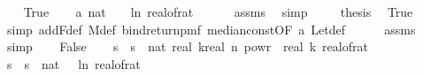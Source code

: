 \begin{isabellebody}
\ \ \isamarkupfalse%
\ True\isanewline
\ \ \isamarkupfalse%
\ a{\isacharcolon}{\kern0pt}\ {\isachardoublequoteopen}nat\ {\isasymlceil}{\isacharminus}{\kern0pt}\ {\isacharparenleft}{\kern0pt}{}{}\ {\isacharasterisk}{\kern0pt}\ ln\ {\isacharparenleft}{\kern0pt}real{\isacharunderscore}{\kern0pt}of{\isacharunderscore}{\kern0pt}rat\ {\isasymepsilon}{\isacharparenright}{\kern0pt}{\isacharparenright}{\kern0pt}{\isasymrceil}\ {\isachargreater}{\kern0pt}\ {}{\isachardoublequoteclose}\ \ \isamarkupfalse%
\ assms\ \isamarkupfalse%
\ simp\ \isanewline
\ \ \isamarkupfalse%
\ {\isacharquery}{\kern0pt}thesis\ \isamarkupfalse%
\ True\ \isamarkupfalse%
\ {\isacharparenleft}{\kern0pt}simp\ add{\isacharcolon}{\kern0pt}F{\isacharunderscore}{\kern0pt}def\ M{\isacharunderscore}{\kern0pt}def\ bind{\isacharunderscore}{\kern0pt}return{\isacharunderscore}{\kern0pt}pmf\ median{\isacharunderscore}{\kern0pt}const{\isacharbrackleft}{\kern0pt}OF\ a{\isacharbrackright}{\kern0pt}\ Let{\isacharunderscore}{\kern0pt}def{\isacharparenright}{\kern0pt}\isanewline
\ \ \ \ \isamarkupfalse%
\ assms{\isacharparenleft}{\kern0pt}{}{\isacharparenright}{\kern0pt}\ \isamarkupfalse%
\ simp\isanewline
{}\isamarkupfalse%
\isanewline
\ \ \isamarkupfalse%
\ False\isanewline
\ \ \isamarkupfalse%
\ s\ \ {\isachardoublequoteopen}s\ {\isacharequal}{\kern0pt}\ nat\ {\isasymlceil}{}{\isacharasterisk}{\kern0pt}real\ k{\isacharasterisk}{\kern0pt}{\isacharparenleft}{\kern0pt}real\ n{\isacharparenright}{\kern0pt}\ powr\ {\isacharparenleft}{\kern0pt}{}{\isacharminus}{\kern0pt}{}{\isacharslash}{\kern0pt}\ real\ k{\isacharparenright}{\kern0pt}{\isacharslash}{\kern0pt}\ {\isacharparenleft}{\kern0pt}real{\isacharunderscore}{\kern0pt}of{\isacharunderscore}{\kern0pt}rat\ {\isasymdelta}{\isacharparenright}{\kern0pt}\isanewline
\ \ \isamarkupfalse%
\ s\ \ {\isachardoublequoteopen}s\ {\isacharequal}{\kern0pt}\ nat\ {\isasymlceil}{\isacharminus}{\kern0pt}{\isacharparenleft}{\kern0pt}{}{}\ {\isacharasterisk}{\kern0pt}\ ln\ {\isacharparenleft}{\kern0pt}real{\isacharunderscore}{\kern0pt}of{\isacharunderscore}{\kern0pt}rat\ {\isasymepsilon}{\isacharparenright}{\kern0pt}{\isacharparenright}{\kern0pt}{\isasymrceil}{\isachardoublequoteclose}\isanewline

\end{isabellebody}
